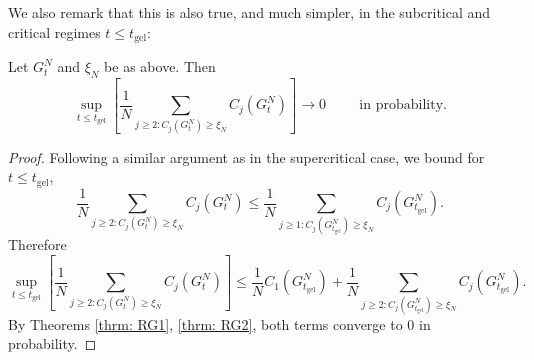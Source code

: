 We also remark that this is also true, and much simpler, in the subcritical and critical regimes $t\le t_\text{gel}:$ 
\begin{lemma}\label{lemma: large clusters below criticality} Let $G^N_t$ and $\xi_N$ be as above. Then \begin{equation}
    \sup_{t\le t_\text{gel}} \left[\frac{1}{N}\sum_{j\geq 2: C_j(G^N_t)\ge \xi_N} C_j(G^N_t)\right]\rightarrow 0\hspace{1cm}\text{in probability}.
\end{equation} \end{lemma}\begin{proof} Following a similar argument as in the supercritical case, we bound for $t\leq t_\text{gel}$, \begin{equation}
    \frac{1}{N}\sum_{j\geq 2: C_j(G^N_t)\geq \xi_N} C_j(G^N_t) \leq \frac{1}{N}\sum_{j\geq 1: C_j(G^N_{t_\text{gel}})\geq \xi_N} C_j(G^N_{t_\text{gel}}).
\end{equation} Therefore \begin{equation}
    \sup_{t\le t_\text{gel}} \left[\frac{1}{N}\sum_{j\geq 2: C_j(G^N_t)\geq \xi_N} C_j(G^N_t)\right] \leq  \frac{1}{N}C_1(G^N_{t_\text{gel}})+ \frac{1}{N}\sum_{j\geq 2: C_j(G^N_{t_\text{gel}})\geq \xi_N} C_j(G^N_{t_\text{gel}}).
\end{equation} By Theorems \ref{thrm: RG1}, \ref{thrm: RG2}, both terms converge to $0$ in probability. \end{proof}  
